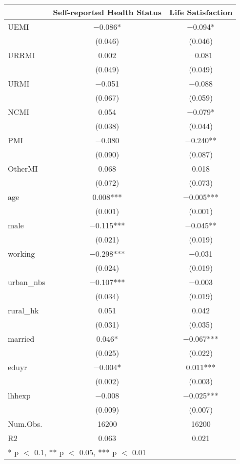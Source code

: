\begin{table}
\centering
\begin{tabular}[t]{lcc}
\toprule
  & Self-reported Health Status & Life Satisfaction\\
\midrule
UEMI & \num{-0.086}* & \num{-0.094}*\\
 & (\num{0.046}) & (\num{0.046})\\
URRMI & \num{0.002} & \num{-0.081}\\
 & (\num{0.049}) & (\num{0.049})\\
URMI & \num{-0.051} & \num{-0.088}\\
 & (\num{0.067}) & (\num{0.059})\\
NCMI & \num{0.054} & \num{-0.079}*\\
 & (\num{0.038}) & (\num{0.044})\\
PMI & \num{-0.080} & \num{-0.240}**\\
 & (\num{0.090}) & (\num{0.087})\\
OtherMI & \num{0.068} & \num{0.018}\\
 & (\num{0.072}) & (\num{0.073})\\
age & \num{0.008}*** & \num{-0.005}***\\
 & (\num{0.001}) & (\num{0.001})\\
male & \num{-0.115}*** & \num{-0.045}**\\
 & (\num{0.021}) & (\num{0.019})\\
working & \num{-0.298}*** & \num{-0.031}\\
 & (\num{0.024}) & (\num{0.019})\\
urban\_nbs & \num{-0.107}*** & \num{-0.003}\\
 & (\num{0.034}) & (\num{0.019})\\
rural\_hk & \num{0.051} & \num{0.042}\\
 & (\num{0.031}) & (\num{0.035})\\
married & \num{0.046}* & \num{-0.067}***\\
 & (\num{0.025}) & (\num{0.022})\\
eduyr & \num{-0.004}* & \num{0.011}***\\
 & (\num{0.002}) & (\num{0.003})\\
lhhexp & \num{-0.008} & \num{-0.025}***\\
 & (\num{0.009}) & (\num{0.007})\\
\midrule
Num.Obs. & \num{16200} & \num{16200}\\
R2 & \num{0.063} & \num{0.021}\\
\bottomrule
\multicolumn{3}{l}{\rule{0pt}{1em}* p $<$ 0.1, ** p $<$ 0.05, *** p $<$ 0.01}\\
\end{tabular}
\end{table}
